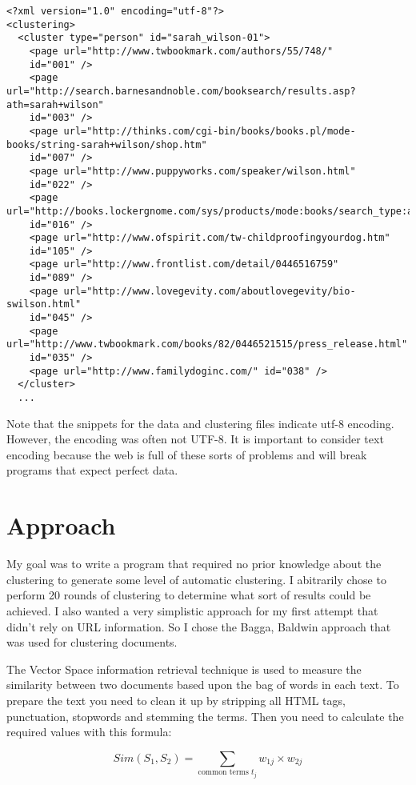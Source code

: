 \documentclass[12pt,twoside,letterpaper]{article}
\begin{document}
\begin{verbatim}
<?xml version="1.0" encoding="utf-8"?>
<clustering>
  <cluster type="person" id="sarah_wilson-01">
    <page url="http://www.twbookmark.com/authors/55/748/"
    id="001" />
    <page url="http://search.barnesandnoble.com/booksearch/results.asp?ath=sarah+wilson"
    id="003" />
    <page url="http://thinks.com/cgi-bin/books/books.pl/mode-books/string-sarah+wilson/shop.htm"
    id="007" />
    <page url="http://www.puppyworks.com/speaker/wilson.html"
    id="022" />
    <page url="http://books.lockergnome.com/sys/products/mode:books/search_type:authorsearch/input_string:sarah+wilson/locale:us"
    id="016" />
    <page url="http://www.ofspirit.com/tw-childproofingyourdog.htm"
    id="105" />
    <page url="http://www.frontlist.com/detail/0446516759"
    id="089" />
    <page url="http://www.lovegevity.com/aboutlovegevity/bio-swilson.html"
    id="045" />
    <page url="http://www.twbookmark.com/books/82/0446521515/press_release.html"
    id="035" />
    <page url="http://www.familydoginc.com/" id="038" />
  </cluster>
  ...
\end{verbatim}

Note that the snippets for the data and clustering files indicate utf-8 encoding. However, the encoding was often not UTF-8. It is important to consider text encoding because the web is full of these sorts of problems and will break programs that expect perfect data.

\section{Approach}

My goal was to write a program that required no prior knowledge about the clustering to generate some level of automatic clustering. I abitrarily chose to perform 20 rounds of clustering to determine what sort of results could be achieved. I also wanted a very simplistic approach for my first attempt that didn't rely on URL information. So I chose the Bagga, Baldwin approach that was used for clustering documents. 

The Vector Space information retrieval technique is used to measure the similarity between two documents based upon the bag of words in each text. To prepare the text you need to clean it up by stripping all HTML tags, punctuation, stopwords and stemming the terms. Then you need to calculate the required values with this formula:

$$Sim(S_1, S_2) = \sum_{\mbox{common terms }t_j}w_{1j} \times w_{2j}$$
\end{document}
